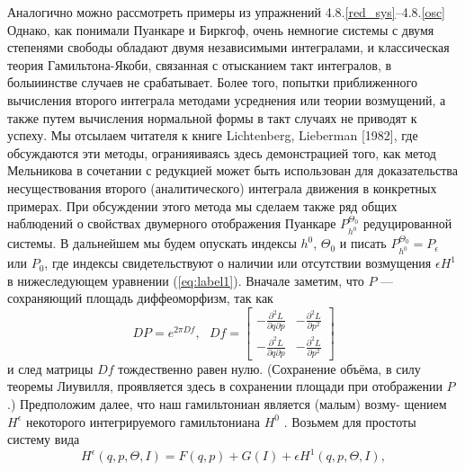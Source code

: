 \documentclass[twoside, a4paper]{article}
\begin{document}
Аналогично можно рассмотреть примеры из упражнений 4.8.\ref{red_sys}--4.8.\ref{osc} Однако, как понимали Пуанкаре и Биркгоф, очень немногие системы с двумя степенями свободы обладают двумя независимыми интегралами, и классическая теория Гамильтона-Якоби, связанная с отысканием такт интегралов, в болыиинстве случаев не срабатывает. Более того, попытки приближенного вычисления второго интеграла методами усреднения или теории возмущений, а также путем вычисления нормальной формы в такт случаях не приводят к успеху. Мы отсылаем читателя к книге Lichtenberg, Lieberman [1982], где обсуждаются эти методы, огранияиваясь здесь демонстрацией того, как метод Мельникова в сочетании с редукцией может быть использован для доказательства несуществования второго (аналитического) интеграла движения в конкретных примерах. При обсуждении этого метода мы сделаем также ряд общих наблюдений о свойствах двумерного отображения Пуанкаре $P_{h^0}^{\Theta_0}$ редуцированной системы. В дальнейшем мы будем опускать индексы $h^0$, $\Theta_0$ и  писать $P_{h^0}^{\Theta_0}=P_\epsilon$ или $P_0$, где индексы свидетельствуют о наличии или отсутствии возмущения $\epsilon H^1$ в нижеследующем уравнении (\ref{eq:label1}).
Вначале заметим, что $P$ --- сохраняющий площадь диффеоморфизм, так
как
\begin{equation}
DP=e^{2\pi Df} , \text{~~}  Df=
\left[\begin{array}{cc}
-\frac{\partial^2L}{\partial q\partial p} & -\frac{\partial^2L}{\partial p^2} \\
-\frac{\partial^2L}{\partial q\partial p} & -\frac{\partial^2L}{\partial p^2}
\end{array}\right]
\end{equation}
и след матрицы $Df$ тождественно равен нулю. (Сохранение объёма, в силу теоремы Лиувилля, проявляется здесь в сохранении площади при отображении $P$.)
Предположим далее, что наш гамильтониан является (малым) возму- щением $H^\epsilon$ некоторого интегрируемого гамильтониана $H^0$ . Возьмем для простоты систему вида
\begin{equation}
H^\epsilon (q,p,\Theta,I) = F(q,p)+G(I)+\epsilon H^1(q,p,\Theta, I),
\label{eq:label1}
\end{equation}
\end{document}
